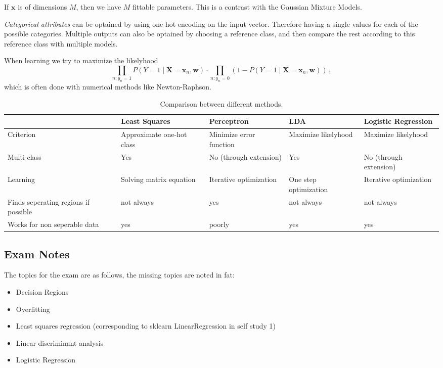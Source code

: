 If $\mathbf{x}$ is of dimensions $M$, then we have $M$ fittable parameters.
This is a contrast with the Gaussian Mixture Models.

\emph{Categorical attributes} can be optained by using one hot encoding on the input vector.
Therefore having a single values for each of the possible categories.
Multiple outputs can also be optained by choosing a reference class, and then compare the rest according to this reference class with multiple models.

When learning we try to maximize the likelyhood
\[
    \prod_{n:y_n=1} P(Y = 1 \mid \mathbf{X} = \mathbf{x}_n, \mathbf{w}) \cdot \prod_{n:y_n=0} (1 - P(Y = 1 \mid \mathbf{X} = \mathbf{x}_n, \mathbf{w}))\,,
\]
which is often done with numerical methods like Newton-Raphson.

\begin{table}[h]
    \begin{tabularx}{\linewidth}{XXXXX}
        \toprule
                  & Least Squares & Perceptron & LDA & Logistic Regression \\ \midrule
        Criterion & Approximate one-hot class & Minimize error function & Maximize likelyhood & Maximize likelyhood \\
        Multi-class & Yes & No (through extension) & Yes & No (through extension)  \\
        Learning & Solving matrix equation & Iterative optimization & One step optimization & Iterative optimization \\
        Finds seperating regions if possible & not always & yes & not always & not always \\
        Works for non seperable data & yes & poorly & yes & yes \\ \bottomrule
    \end{tabularx}
    \caption{Comparison between different methods.}
    \label{tab:lin:compare}
\end{table}

\subsection{Exam Notes}

The topics for the exam are as follows, the missing topics are noted in fat:
\begin{itemize}
    \item Decision Regions
    \item Overfitting
    \item Least squares regression (corresponding to sklearn LinearRegression in self study 1)
    \item Linear discriminant analysis
    \item Logistic Regression
\end{itemize}

